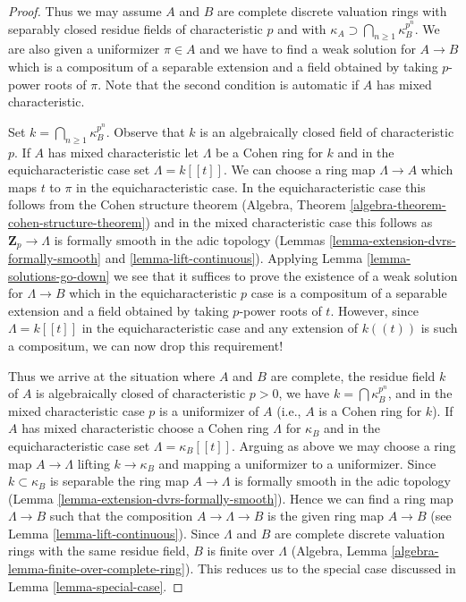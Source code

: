 \documentclass[10pt,a4paper]{amsart}
\theoremstyle{plain}
\theoremstyle{definition}
\theoremstyle{remark}
\numberwithin{equation}{subsection}
\begin{document}
\begin{proof}
\medskip\noindent
Thus we may assume $A$ and $B$ are complete discrete valuation rings
with separably closed residue fields of characteristic $p$ and
with $\kappa_A \supset \bigcap\nolimits_{n \geq 1} \kappa_B^{p^n}$.
We are also given a uniformizer $\pi \in A$ and we have to find a
weak solution for $A \to B$ which is a compositum of a separable
extension and a field obtained by taking $p$-power roots of $\pi$.
Note that the second condition is automatic if $A$ has mixed characteristic.

\medskip\noindent
Set $k = \bigcap\nolimits_{n \geq 1} \kappa_B^{p^n}$.
Observe that $k$ is an algebraically closed field of characteristic $p$.
If $A$ has mixed characteristic let $\Lambda$ be a Cohen
ring for $k$ and in the equicharacteristic case set $\Lambda = k[[t]]$.
We can choose a ring map $\Lambda \to A$ which maps $t$ to $\pi$ in the
equicharacteristic case. In the equicharacteristic case this follows
from the Cohen structure theorem
(Algebra, Theorem \ref{algebra-theorem-cohen-structure-theorem}) and
in the mixed characteristic case this follows as
$\mathbf{Z}_p \to \Lambda$ is formally smooth in the adic topology
(Lemmas \ref{lemma-extension-dvrs-formally-smooth} and
\ref{lemma-lift-continuous}).
Applying Lemma \ref{lemma-solutions-go-down} we see that it suffices to prove
the existence of a weak solution for $\Lambda \to B$ which in
the equicharacteristic $p$ case is a compositum of a separable
extension and a field obtained by taking $p$-power roots of $t$.
However, since $\Lambda = k[[t]]$ in the equicharacteristic case
and any extension of $k((t))$ is such a compositum, we can now
drop this requirement!

\medskip\noindent
Thus we arrive at the situation where $A$ and $B$ are complete, the residue
field $k$ of $A$ is algebraically closed of characteristic $p > 0$,
we have $k = \bigcap \kappa_B^{p^n}$, and in the mixed characteristic
case $p$ is a uniformizer of $A$ (i.e., $A$ is a Cohen ring for $k$).
If $A$ has mixed characteristic choose a Cohen ring
$\Lambda$ for $\kappa_B$ and in the equicharacteristic case set
$\Lambda = \kappa_B[[t]]$. Arguing as above we may choose a ring map
$A \to \Lambda$ lifting $k \to \kappa_B$ and mapping a uniformizer
to a uniformizer. Since $k \subset \kappa_B$ is separable the ring
map $A \to \Lambda$ is formally smooth in the adic topology
(Lemma \ref{lemma-extension-dvrs-formally-smooth}). Hence
we can find a ring map $\Lambda \to B$ such that the composition
$A \to \Lambda \to B$ is the given ring map $A \to B$ (see
Lemma \ref{lemma-lift-continuous}).
Since $\Lambda$ and $B$ are complete discrete valuation rings with the same
residue field, $B$ is finite over $\Lambda$
(Algebra, Lemma \ref{algebra-lemma-finite-over-complete-ring}).
This reduces us to the special case discussed in
Lemma \ref{lemma-special-case}.
\end{proof}
\end{document}
